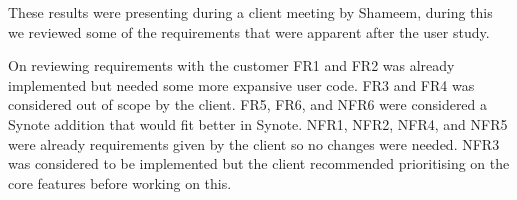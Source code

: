 These results were presenting during a client meeting by Shameem, during this we reviewed some of the requirements that were apparent after the user study.

On reviewing requirements with the customer FR1 and FR2 was already implemented but needed some more expansive user code. FR3 and FR4 was considered out of scope by the client. FR5, FR6, and NFR6 were considered a Synote addition that would fit better in Synote. NFR1, NFR2, NFR4, and NFR5 were already requirements given by the client so no changes were needed. NFR3 was considered to be implemented but the client recommended prioritising on the core features before working on this. 
